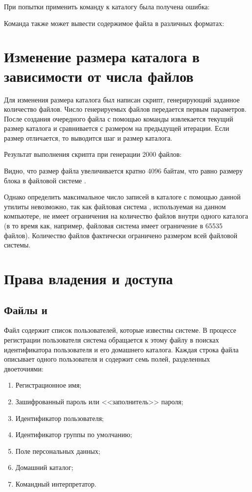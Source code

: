 При попытки применить команду к каталогу была получена ошибка:


Команда  также может вывести содержимое файла в различных форматах:


\section{Изменение размера каталога в зависимости от числа файлов}

Для изменения размера каталога был написан скрипт, генерирующий заданное количество файлов. Число генерируемых файлов передается первым параметров. После создания очередного файла с помощью команды  извлекается текущий размер каталога и сравнивается с размером на предыдущей итерации. Если размер отличается, то выводится шаг и размер каталога.


Результат выполнения скрипта при генерации 2000 файлов:


Видно, что размер файла увеличивается кратно 4096 байтам, что равно размеру блока в файловой системе . 

Однако определить максимальное число записей в каталоге с помощью данной утилиты невозможно, так как файловая система , используемая на данном компьютере, не имеет ограничения на количество файлов внутри одного каталога (в то время как, например, файловая система  имеет ограничение в 65535 файлов). Количество файлов фактически ограничено размером всей файловой системы.

\section{Права владения и доступа}

\subsection{Файлы  и }

Файл  содержит список пользователей, которые известны системе. В процессе регистрации пользователя система обращается к этому файлу в поисках идентификатора пользователя и его домашнего каталога. Каждая строка файла описывает одного пользователя и  содержит семь полей, разделенных двоеточиями:
\begin{enumerate}
	\item Регистрационное имя;
	\item Зашифрованный пароль или <<заполнитель>> пароля;
	\item Идентификатор пользователя;
	\item Идентификатор группы по умолчанию;
	\item Поле персональных данных;
	\item Домашний каталог;
	\item Командный интерпретатор.
\end{enumerate}

